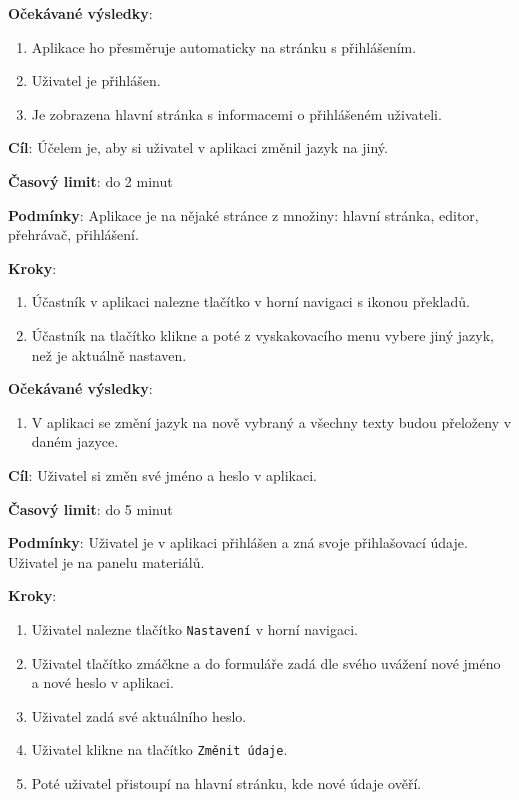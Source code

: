 \textbf{Očekávané výsledky}:

\begin{enumerate}[leftmargin=1.4cm]
    \item Aplikace ho přesměruje automaticky na stránku s přihlášením.
    \item Uživatel je přihlášen.
    \item Je zobrazena hlavní stránka s informacemi o přihlášeném uživateli.
\end{enumerate}


\vspace{1em}

\textbf{Cíl}: Účelem je, aby si uživatel v aplikaci změnil jazyk na jiný.

\textbf{Časový limit}: do 2 minut

\textbf{Podmínky}: Aplikace je na nějaké stránce z množiny: hlavní stránka, editor, přehrávač, přihlášení.

\textbf{Kroky}:

\begin{enumerate}[leftmargin=1.4cm]
    \item Účastník v aplikaci nalezne tlačítko v horní navigaci s ikonou překladů.
    \item Účastník na tlačítko klikne a poté z vyskakovacího menu vybere jiný jazyk, než je aktuálně nastaven.
\end{enumerate}

\textbf{Očekávané výsledky}:

\begin{enumerate}[leftmargin=1.4cm]
    \item V aplikaci se změní jazyk na nově vybraný a všechny texty budou přeloženy v daném jazyce.
\end{enumerate}






\vspace{1em}

\textbf{Cíl}: Uživatel si změn své jméno a heslo v aplikaci.

\textbf{Časový limit}: do 5 minut

\textbf{Podmínky}: Uživatel je v aplikaci přihlášen a zná svoje přihlašovací údaje. Uživatel je na panelu materiálů.

\textbf{Kroky}:

\begin{enumerate}[leftmargin=1.4cm]
    \item Uživatel nalezne tlačítko \verb|Nastavení| v horní navigaci.
    \item Uživatel tlačítko zmáčkne a do formuláře zadá dle svého uvážení nové jméno a nové heslo v aplikaci.
    \item Uživatel zadá své aktuálního heslo.
    \item Uživatel klikne na tlačítko \verb|Změnit údaje|.
    \item Poté uživatel přistoupí na hlavní stránku, kde nové údaje ověří.
\end{enumerate}

